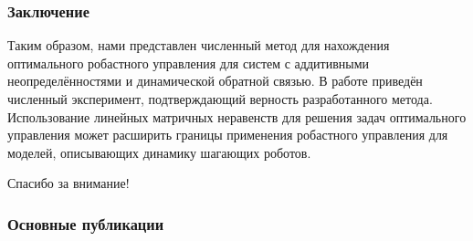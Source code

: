 
\begin{frame}
    \frametitle{Заключение}
	Таким образом, нами представлен численный метод для нахождения оптимального робастного управления для систем с аддитивными неопределённостями и динамической обратной связью. 
	\vfill
	В работе приведён численный эксперимент, подтверждающий верность разработанного метода. 
	\vfill
	Использование линейных матричных неравенств для решения задач оптимального управления может расширить границы применения робастного управления для моделей, описывающих динамику шагающих роботов.
\end{frame}


\begin{frame} %
    \begin{center}
        \Huge
        Спасибо за внимание!
    \end{center}
\end{frame}

\begin{frame} %
		\frametitle{Основные публикации}
		\nocite{scbib1}%
		\nocite{Mistry2010}
		\nocite{RobotConfig}%
		\nocite{SAVIN2021}%
		\nocite{bib1}%
	\end{frame}
